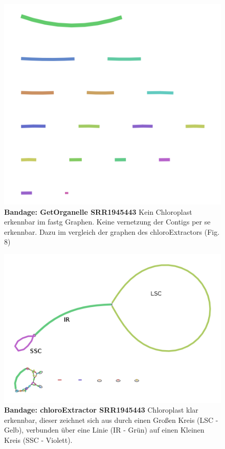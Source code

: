 \documentclass{scrartcl}
\begin{document}
\begin{figure}
\includegraphics[width=.9\linewidth]{./graph_GO_SRR1945443.png}
\caption[Bandage: GetOrganelle SRR1945443]{\textbf{Bandage: GetOrganelle SRR1945443} Kein Chloroplast erkennbar im fastg Graphen. Keine vernetzung der Contigs per se erkennbar. Dazu im vergleich der graphen des chloroExtractors (Fig. 8)}
\end{figure}
\begin{figure}
\includegraphics[width=.9\linewidth]{./graph_CE_SRR1945443_1.png}
\caption[Bandage: chloroExtractor SRR1945443]{\textbf{Bandage: chloroExtractor SRR1945443} Chloroplast klar erkennbar, dieser zeichnet sich aus durch einen Großen Kreis (LSC - Gelb), verbunden über eine Linie (IR - Grün) auf einen Kleinen Kreis (SSC - Violett). }
\end{figure}
\end{document}
